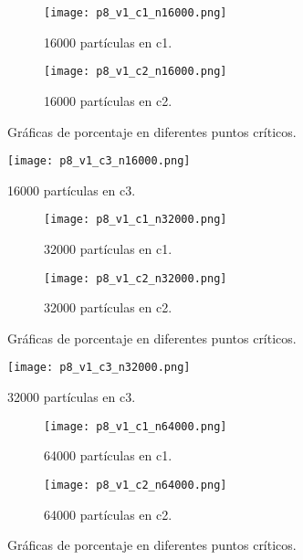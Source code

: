 \documentclass{article}
\begin{document}
\begin{figure}[H]
\centering
\begin{subfigure}[b]{0.40\linewidth}
\texttt{[image: p8\_v1\_c1\_n16000.png]}
\caption{16000 partículas en c1.}
\end{subfigure}
\begin{subfigure}[b]{0.40\linewidth}
\texttt{[image: p8\_v1\_c2\_n16000.png]}
\caption{16000 partículas en c2.}
\end{subfigure}
\caption{Gráficas de porcentaje en diferentes puntos críticos.}
\label{fig:westminster}
\end{figure}

\begin{figure}[H]
\centering
\texttt{[image: p8\_v1\_c3\_n16000.png]}
\caption{\label{fig3} 16000 partículas en c3.}
\end{figure}

\begin{figure}[H]
\centering
\begin{subfigure}[b]{0.40\linewidth}
\texttt{[image: p8\_v1\_c1\_n32000.png]}
\caption{32000 partículas en c1.}
\end{subfigure}
\begin{subfigure}[b]{0.40\linewidth}
\texttt{[image: p8\_v1\_c2\_n32000.png]}
\caption{32000 partículas en c2.}
\end{subfigure}
\caption{Gráficas de porcentaje en diferentes puntos críticos.}
\label{fig:westminster}
\end{figure}

\begin{figure}[H]
\centering
\texttt{[image: p8\_v1\_c3\_n32000.png]}
\caption{\label{fig3} 32000 partículas en c3.}
\end{figure}

\begin{figure}[H]
\centering
\begin{subfigure}[b]{0.40\linewidth}
\texttt{[image: p8\_v1\_c1\_n64000.png]}
\caption{64000 partículas en c1.}
\end{subfigure}
\begin{subfigure}[b]{0.40\linewidth}
\texttt{[image: p8\_v1\_c2\_n64000.png]}
\caption{64000 partículas en c2.}
\end{subfigure}
\caption{Gráficas de porcentaje en diferentes puntos críticos.}
\label{fig:westminster}
\end{figure}
\end{document}
